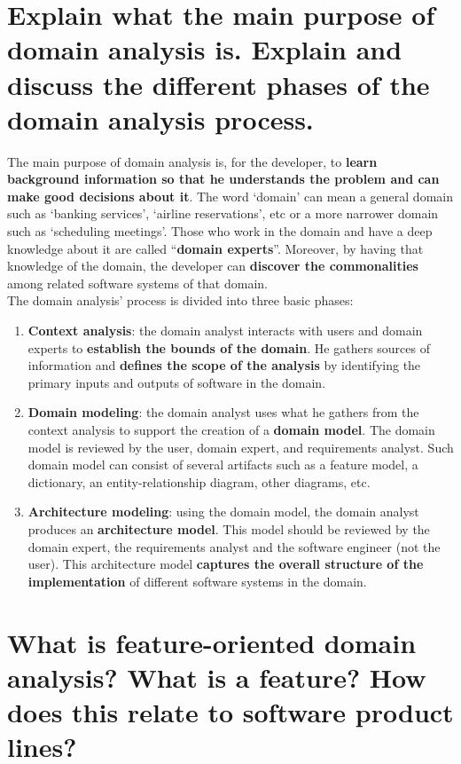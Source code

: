 \section{Explain what the main purpose of domain analysis is.
Explain and discuss the different phases of the domain analysis process.}

The main purpose of domain analysis is, for the developer, to \textbf{learn background information so that he understands the problem and can make good decisions about it}. The word ‘domain’ can mean a general domain such as ‘banking services’, ‘airline reservations’, etc or a more narrower domain such as ‘scheduling meetings’. Those who work in the domain and have a deep knowledge about it are called “\textbf{domain experts}”. Moreover, by having that knowledge of the domain, the developer can \textbf{discover the commonalities} among related software systems of that domain.\\

The domain analysis’ process is divided into three basic phases:
\begin{enumerate}
\item \textbf{Context analysis}: the domain analyst interacts with users and domain experts to \textbf{establish the bounds of the domain}. He gathers sources of information and \textbf{defines the scope of the analysis} by identifying the primary inputs and outputs of software in the domain.
\item \textbf{Domain modeling}: the domain analyst uses what he gathers from the context analysis to support the creation of a \textbf{domain model}. The domain model is reviewed by the user, domain expert, and requirements analyst. Such domain model can consist of several artifacts such as a feature model, a dictionary, an entity-relationship diagram, other diagrams, etc.
\item \textbf{Architecture modeling}: using the domain model, the domain analyst produces an \textbf{architecture model}. This model should be reviewed by the domain expert, the requirements analyst and the software engineer (not the user). This architecture model \textbf{captures the overall structure of the implementation} of different software systems in the domain.
\end{enumerate}

\section{What is feature-oriented domain analysis? What is a feature?
How does this relate to software product lines?}

